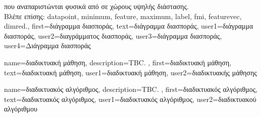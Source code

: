{{		\foreignlanguage{greek}{που αναπαριστώνται φυσικά από}  
		\foreignlanguage{greek}{σε χώρους υψηλής διάστασης.}
		\\
		 \foreignlanguage{greek}{Βλέπε επίσης:} \gls{datapoint}, \gls{minimum}, \gls{feature}, \gls{maximum}, \gls{label}, \gls{fmi}, 
		 \gls{featurevec}, \gls{dimred}.},
	first={\foreignlanguage{greek}{διάγραμμα διασποράς}},
	text={\foreignlanguage{greek}{διάγραμμα διασποράς}},
	user1={\foreignlanguage{greek}{διάγραμμα διασποράς}}, %
  	user2={\foreignlanguage{greek}{διαγράμματος διασποράς}}, %
	user3={\foreignlanguage{greek}{διάγραμμα διασποράς}}, %
	user4={\foreignlanguage{greek}{Διάγραμμα διασποράς}} %
}

{name={\foreignlanguage{greek}{διαδικτυακή μάθηση}},
	description={TBC.  },
	first={\foreignlanguage{greek}{διαδικτυακή μάθηση}},
	text={\foreignlanguage{greek}{διαδικτυακή μάθηση}},
	user1={\foreignlanguage{greek}{διαδικτυακή μάθηση}}, %
  	user2={\foreignlanguage{greek}{διαδικτυακής μάθησης}} %
}

{name={\foreignlanguage{greek}{διαδικτυακός αλγόριθμος}},
	description={TBC. },
	first={\foreignlanguage{greek}{διαδικτυακός αλγόριθμος}},
	text={\foreignlanguage{greek}{διαδικτυακός αλγόριθμος}},
	user1={\foreignlanguage{greek}{διαδικτυακός αλγόριθμος}}, %
  	user2={\foreignlanguage{greek}{διαδικτυακού αλγόριθμου}} %
}

